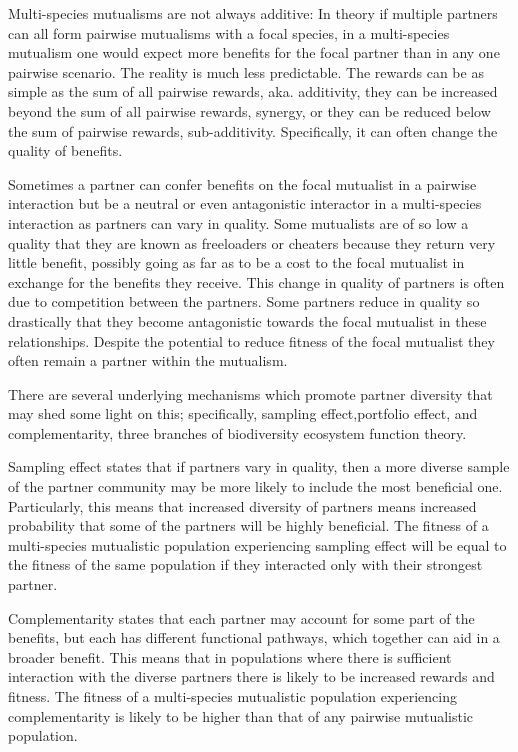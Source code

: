 \documentclass[12pt,a4paper]{article}
\begin{document}
Multi-species mutualisms are not always additive: In theory if multiple partners can all form pairwise mutualisms with a focal species, in a multi-species mutualism one would expect more benefits for the focal partner than in any one pairwise scenario. The reality is much less predictable\cite{Stanton2013,Palmer2010,Song2020}. The rewards can be as simple as the sum of all pairwise rewards, aka. additivity, they can be increased beyond the sum of all pairwise rewards, synergy, or they can be reduced below the sum of pairwise rewards, sub-additivity. Specifically, it can often change the quality of benefits. 

Sometimes a partner can confer benefits on the focal mutualist in a pairwise interaction but be a neutral or even antagonistic interactor in a multi-species interaction as partners can vary in quality\cite{Afkhami2014}. Some mutualists are of so low a quality that they are known as freeloaders or cheaters\cite{Song2020,West2007,Frederickson2013} because they return very little benefit, possibly going as far as to be a cost to the focal mutualist in exchange for the benefits they receive. This change in quality of partners is often due to competition between the partners\cite{Amarasekare2003}. Some partners reduce in quality so drastically that they become antagonistic towards the focal mutualist in these relationships\cite{Afkhami2014,Frederickson2013,Bronstein1994}. Despite the potential to reduce fitness of the focal mutualist they often remain a partner within the mutualism\cite{Jones2015}. 

There are several underlying mechanisms which promote partner diversity that may shed some light on this; specifically, sampling effect,portfolio effect, and complementarity, three branches of biodiversity ecosystem function theory\cite{Batstone2018,Hooper2005}. 

Sampling effect states that if partners vary in quality, then a more diverse sample of the partner community may be more likely to include the most beneficial one\cite{Afkhami2014}. Particularly, this means that increased diversity of partners means increased probability that some of the partners will be highly beneficial. The fitness of a multi-species mutualistic population experiencing sampling effect will be equal to the fitness of the same population if they interacted only with their strongest partner. 

Complementarity states that each partner may account for some part of the benefits, but each has different functional pathways, which together can aid in a broader benefit\cite{Winfree2020}. This means that in populations where there is sufficient interaction with the diverse partners there is likely to be increased rewards and fitness. The fitness of a multi-species mutualistic population experiencing complementarity is likely to be higher than that of any pairwise mutualistic population. 
\end{document}
